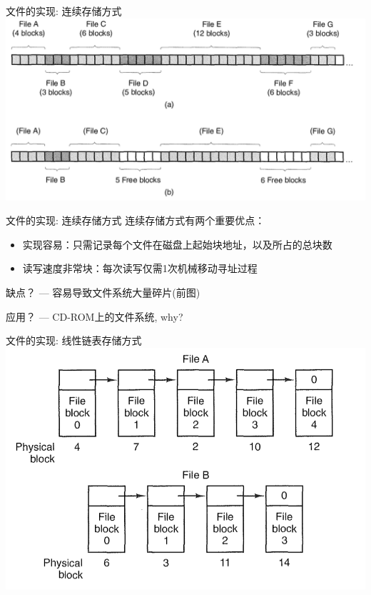 \documentclass[xcolor=svgnames]{beamer}
\begin{document}
\begin{CJK*}{UTF8}{gbsn}
\begin{frame}{文件的实现: 连续存储方式}
\includegraphics[width=1.0\textwidth]{cont.png}
\end{frame}

\begin{frame}{文件的实现: 连续存储方式}
连续存储方式有两个重要优点：
\begin{itemize}
\item 实现容易：只需记录每个文件在磁盘上起始块地址，以及所占的总块数
\item 读写速度非常块：每次读写仅需1次机械移动寻址过程
\end{itemize}

\alert{缺点？} --- 容易导致文件系统大量碎片(前图)

\alert{应用？} --- CD-ROM上的文件系统, why?
\end{frame}

\begin{frame}{文件的实现: 线性链表存储方式}
\includegraphics[width=1.0\textwidth]{linked.png}


\end{frame}
\end{CJK*}
\end{document}
